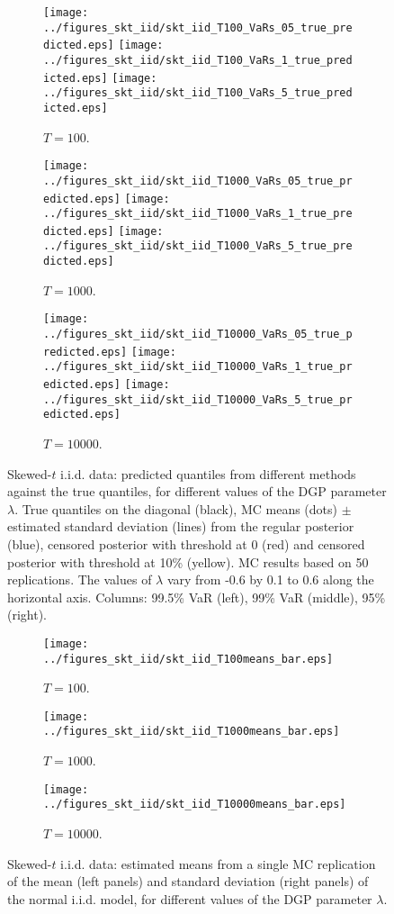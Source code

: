 \documentclass[a4paper,10pt]{article} %
\begin{document}
\begin{figure}
\begin{subfigure}{\linewidth}
\texttt{[image: ../figures\_skt\_iid/skt\_iid\_T100\_VaRs\_05\_true\_predicted.eps]}
\texttt{[image: ../figures\_skt\_iid/skt\_iid\_T100\_VaRs\_1\_true\_predicted.eps]}
\texttt{[image: ../figures\_skt\_iid/skt\_iid\_T100\_VaRs\_5\_true\_predicted.eps]}
\caption{$T=100$.}
\end{subfigure}
\begin{subfigure}{\linewidth}
\texttt{[image: ../figures\_skt\_iid/skt\_iid\_T1000\_VaRs\_05\_true\_predicted.eps]}
\texttt{[image: ../figures\_skt\_iid/skt\_iid\_T1000\_VaRs\_1\_true\_predicted.eps]}
\texttt{[image: ../figures\_skt\_iid/skt\_iid\_T1000\_VaRs\_5\_true\_predicted.eps]}
\caption{$T=1000$.}
\end{subfigure}
\begin{subfigure}{\linewidth}
\texttt{[image: ../figures\_skt\_iid/skt\_iid\_T10000\_VaRs\_05\_true\_predicted.eps]}
\texttt{[image: ../figures\_skt\_iid/skt\_iid\_T10000\_VaRs\_1\_true\_predicted.eps]}
\texttt{[image: ../figures\_skt\_iid/skt\_iid\_T10000\_VaRs\_5\_true\_predicted.eps]}
\caption{$T=10000$.}
\end{subfigure}
\caption{Skewed-$t$ i.i.d. data: predicted quantiles from different methods against the true quantiles, for different values of the DGP parameter $\lambda$.
True quantiles on the diagonal (black), MC means (dots) $\pm$ estimated standard deviation (lines) from the regular posterior (blue), censored posterior with threshold at 0 (red) and censored posterior with threshold at 10\% (yellow).  
MC results based on 50 replications. 
The values of $\lambda$ vary from -0.6 by 0.1 to 0.6 along the horizontal axis.
Columns: 99.5\% VaR (left), 99\% VaR (middle), 95\% (right).}
\label{fig:skt_iid_vars}
\end{figure}



\begin{figure}
\begin{subfigure}{\linewidth}
\texttt{[image: ../figures\_skt\_iid/skt\_iid\_T100means\_bar.eps]}
\caption{$T=100$.}
\end{subfigure}
\begin{subfigure}{\linewidth}
\texttt{[image: ../figures\_skt\_iid/skt\_iid\_T1000means\_bar.eps]}
\caption{$T=1000$.}
\end{subfigure}
\begin{subfigure}{\linewidth}
\texttt{[image: ../figures\_skt\_iid/skt\_iid\_T10000means\_bar.eps]}
\caption{$T=10000$.}
\end{subfigure}
\caption{Skewed-$t$ i.i.d. data: estimated means from a single MC replication of the mean (left panels) and standard deviation (right panels) of the normal i.i.d. model, for different values of the DGP parameter $\lambda$. }
\label{fig:skt_iid_means}
\end{figure}
\end{document}
